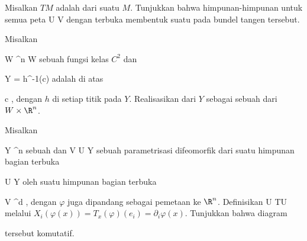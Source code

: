 {}
{

Misalkan $TM$ adalah
dari suatu
$M$. Tunjukkan bahwa himpunan-himpunan
 untuk semua peta
\maabbdisp {\alpha} { U } { V
} {}
dengan
 terbuka membentuk suatu
pada bundel tangen tersebut.

}
{} {}

{}
{

Misalkan

\mavergleichskette
{\vergleichskette
{ W
}
{ \subseteq }{ \R^n
}
{  }{
}
{    }{
}
{   }{
}
}
{}{}{}
 { W } { \R
} {}
sebuah
fungsi kelas $C^2$
dan

\mavergleichskette
{\vergleichskette
{ Y
}
{ = }{ h^{-1}(c)
}
{  }{
}
{    }{
}
{   }{
}
}
{}{}{}
adalah
di atas

\mavergleichskette
{\vergleichskette
{ c
}
{ \in }{ \R
}
{  }{
}
{    }{
}
{   }{
}
}
{}{}{,}
dengan $h$
di setiap titik pada $Y$. Realisasikan
dari $Y$ sebagai sebuah
dari $W \times \R^n$.

}
{} {}

{}
{

Misalkan

\mavergleichskette
{\vergleichskette
{ Y
}
{ \subseteq }{ \R^n
}
{  }{
}
{    }{
}
{   }{
}
}
{}{}{}
sebuah
dan
\maabb {\varphi} { V } { U \subseteq Y
} {}
sebuah parametrisasi difeomorfik dari suatu himpunan bagian terbuka

\mavergleichskette
{\vergleichskette
{ U
}
{ \subseteq }{ Y
}
{  }{
}
{    }{
}
{   }{
}
}
{}{}{}
oleh suatu himpunan bagian terbuka

\mavergleichskette
{\vergleichskette
{ V
}
{ \subseteq }{ \R^d
}
{  }{
}
{    }{
}
{   }{
}
}
{}{}{,}
dengan $\varphi$ juga dipandang sebagai pemetaan ke $\R^n$. Definisikan
 {U} {TU
} {}
melalui $X_i(\varphi(x))=T_x(\varphi)(e_i)=\partial_i\varphi(x)$. Tunjukkan bahwa diagram

 {  }

tersebut komutatif.

}
{} {}

